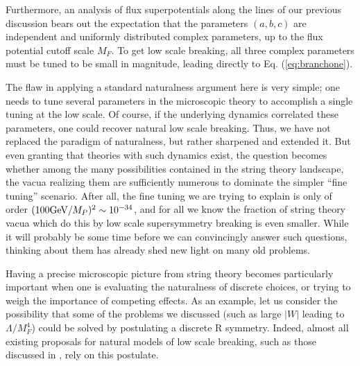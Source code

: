 \documentclass[aps,amsfonts]{ar2e}
\begin{document}
Furthermore, an analysis of flux superpotentials along the lines of
our previous discussion bears out the expectation that the parameters
$(a,b,c)$ are independent and uniformly distributed complex
parameters, up to the flux potential cutoff scale $M_{F}$.  To get low
scale breaking, all three complex parameters must be tuned to be small
in magnitude, leading directly to Eq. (\ref{eq:branchone}).

The flaw in applying a standard naturalness argument here is very
simple; one needs to tune several parameters in the microscopic theory
to accomplish a single tuning at the low scale.  Of course, if the
underlying dynamics correlated these parameters, one could recover
natural low scale breaking.  Thus, we have not replaced the paradigm
of naturalness, but rather sharpened and extended it.  But even
granting that theories with such dynamics exist, the question becomes
whether among the many possibilities contained in the string theory
landscape, the vacua realizing them are sufficiently numerous to dominate
the simpler ``fine tuning'' scenario.  After all,
the fine tuning we are trying to explain is only of order
$(100 {\rm GeV}/M_P)^2 \sim 10^{-34}$, and for all we know the fraction of
string theory vacua which do this by low scale supersymmetry breaking
is even smaller.  While it will probably be some time before we can
convincingly answer such questions, thinking about them has already
shed new light on many old problems.

Having a precise microscopic picture from string theory becomes
particularly important when one is evaluating the naturalness of
discrete choices, or trying to weigh the importance of competing
effects.  As an example, let us consider the possibility that some of
the problems we discussed (such as large $|W|$ leading to
$\Lambda/M_F^4$) could be solved by postulating a discrete R symmetry.
Indeed, almost all existing proposals for natural models of low scale
breaking, such as those discussed in
\cite{Dine:2006gm}, rely on this postulate.
\end{document}
